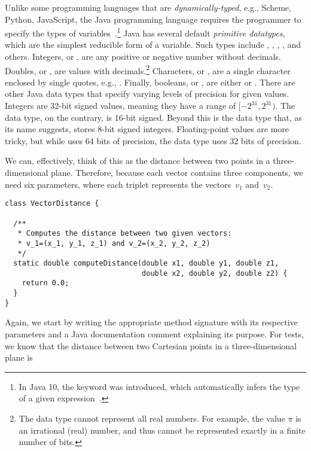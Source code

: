 Unlike some programming languages that are \emph{dynamically-typed}, e.g., Scheme, Python, JavaScript, the Java programming language requires the programmer to specify the types of variables~\citep[Chapter~5]{copl}.\footnote{In Java 10, the  keyword was introduced, which automatically infers the type of a given expression~\citep[Chapter~14]{java}.} 
Java has several default \emph{primitive datatypes}, which are the simplest reducible form of a variable. 
Such types include , , , , and others.
Integers, or , are any positive or negative number without decimals. 
Doubles, or , are values with decimals.\footnote{The  data type cannot represent all real numbers. For example, the value $\pi$ is an irrational (real) number, and thus cannot be represented exactly in a finite number of bits.} 
Characters, or , are a single character enclosed by single quotes, e.g., . 
Finally, booleans, or , are either  or . 
There are other Java data types that specify varying levels of precision for given values. 
Integers are 32-bit signed values, meaning they have a range of $[-2^{31}, 2^{31})$.
The  data type, on the contrary, is 16-bit signed. 
Beyond this is the  data type that, as its name suggests, stores 8-bit signed integers. 
Floating-point values are more tricky, but while  uses 64 bits of precision, the  data type uses 32 bits of precision.

We can, effectively, think of this as the distance between two points in a three-dimensional plane. 
Therefore, because each vector contains three components, we need six parameters, where each triplet represents the vectors~$v_1$ and~$v_2$.

\begin{lstlisting}[language=MyJava]
class VectorDistance {

  /**
   * Computes the distance between two given vectors:
   * v_1=(x_1, y_1, z_1) and v_2=(x_2, y_2, z_2)
   */
  static double computeDistance(double x1, double y1, double z1, 
                                double x2, double y2, double z2) {
    return 0.0;
  }
}
\end{lstlisting}

Again, we start by writing the appropriate method signature with its respective parameters and a Java documentation comment explaining its purpose. 
For tests, we know that the distance between two Cartesian points in a three-dimensional plane is 

